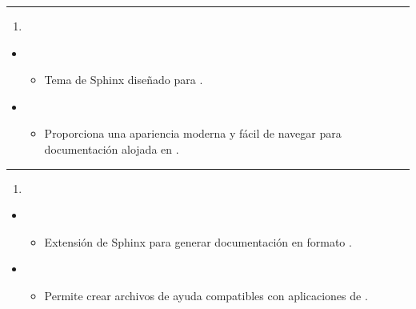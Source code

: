 \documentclass[a4paper,10pt,oneside,spanish,openany]{sphinxmanual}
\begin{document}
\bigskip\hrule\bigskip

\begin{enumerate}
%
\setcounter{enumi}{30}
\item {} 
\sphinxAtStartPar
{}

\end{enumerate}
\begin{itemize}
\item {} 
\sphinxAtStartPar
{}
\begin{itemize}
\item {} 
\sphinxAtStartPar
Tema de Sphinx diseñado para .

\end{itemize}

\item {} 
\sphinxAtStartPar
{}
\begin{itemize}
\item {} 
\sphinxAtStartPar
Proporciona una apariencia moderna y fácil de navegar para documentación alojada en .

\end{itemize}

\end{itemize}


\bigskip\hrule\bigskip

\begin{enumerate}
%
\setcounter{enumi}{31}
\item {} 
\sphinxAtStartPar
{}

\end{enumerate}
\begin{itemize}
\item {} 
\sphinxAtStartPar
{}
\begin{itemize}
\item {} 
\sphinxAtStartPar
Extensión de Sphinx para generar documentación en formato .

\end{itemize}

\item {} 
\sphinxAtStartPar
{}
\begin{itemize}
\item {} 
\sphinxAtStartPar
Permite crear archivos de ayuda compatibles con aplicaciones de .

\end{itemize}

\end{itemize}
\end{document}

